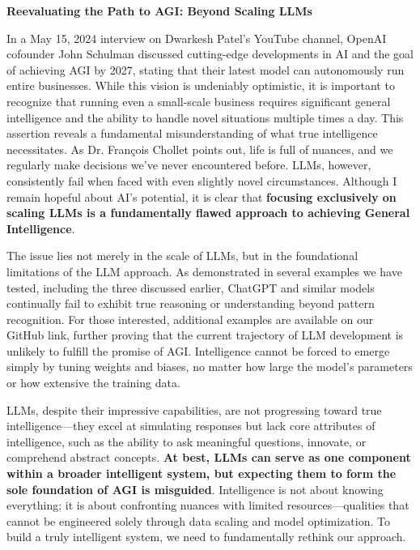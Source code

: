 \documentclass[11pt]{scrartcl}
\begin{document}
\begin{huge}
\textbf{Reevaluating the Path to AGI: Beyond Scaling LLMs}
\end{huge}
In a May 15, 2024 interview on Dwarkesh Patel’s YouTube channel\cite{ref8}, OpenAI cofounder John Schulman discussed cutting-edge developments in AI and the goal of achieving AGI by 2027, stating that their latest model can autonomously run entire businesses. While this vision is undeniably optimistic, it is important to recognize that running even a small-scale business requires significant general intelligence and the ability to handle novel situations multiple times a day. This assertion reveals a fundamental misunderstanding of what true intelligence necessitates. As Dr. François Chollet points out, life is full of nuances, and we regularly make decisions we've never encountered before. LLMs, however, consistently fail when faced with even slightly novel circumstances. Although I remain hopeful about AI's potential, it is clear that \textbf{focusing exclusively on scaling LLMs is a fundamentally flawed approach to achieving General Intelligence}.

The issue lies not merely in the scale of LLMs, but in the foundational limitations of the LLM approach. As demonstrated in several examples we have tested, including the three discussed earlier, ChatGPT and similar models continually fail to exhibit true reasoning or understanding beyond pattern recognition. For those interested, additional examples are available on our GitHub link, further proving that the current trajectory of LLM development is unlikely to fulfill the promise of AGI. Intelligence cannot be forced to emerge simply by tuning weights and biases, no matter how large the model's parameters or how extensive the training data.

LLMs, despite their impressive capabilities, are not progressing toward true intelligence—they excel at simulating responses but lack core attributes of intelligence, such as the ability to ask meaningful questions, innovate, or comprehend abstract concepts. \textbf{At best, LLMs can serve as one component within a broader intelligent system, but expecting them to form the sole foundation of AGI is misguided}. Intelligence is not about knowing everything; it is about confronting nuances with limited resources—qualities that cannot be engineered solely through data scaling and model optimization. To build a truly intelligent system, we need to fundamentally rethink our approach. \\ \\
\end{document}
